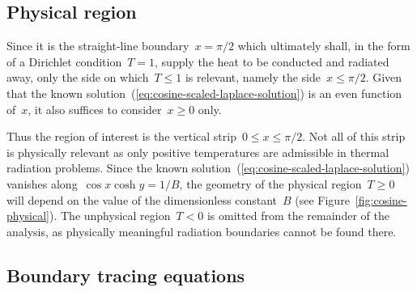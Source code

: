 \subsection{Physical region}
\label{sec:cartesian.cosine.physical}

Since it is the straight-line boundary~$x = \pi/2$
which ultimately shall, in the form of a Dirichlet condition~$T = 1$,
supply the heat to be conducted and radiated away,
only the side on which~$T \le 1$ is relevant,
namely the side~$x \le \pi/2$.
Given that the known solution~(\ref{eq:cosine-scaled-laplace-solution})
is an even function of~$x$,
it also suffices to consider~$x \ge 0$ only.

Thus the region of interest
is the vertical strip~$0 \le x \le \pi/2$.
Not all of this strip is physically relevant
as only positive temperatures are admissible
in thermal radiation problems.
Since the known solution~(\ref{eq:cosine-scaled-laplace-solution})
vanishes along~$\cos x \cosh y = 1 / B$,
the geometry of the physical region~$T \ge 0$
will depend on the value of the dimensionless constant~$B$
(see Figure~\ref{fig:cosine-physical}).
The unphysical region~$T < 0$ is omitted from the remainder of the analysis,
as physically meaningful radiation boundaries cannot be found there.

\subsection{Boundary tracing equations}
\label{sec:cartesian.cosine.tracing}

